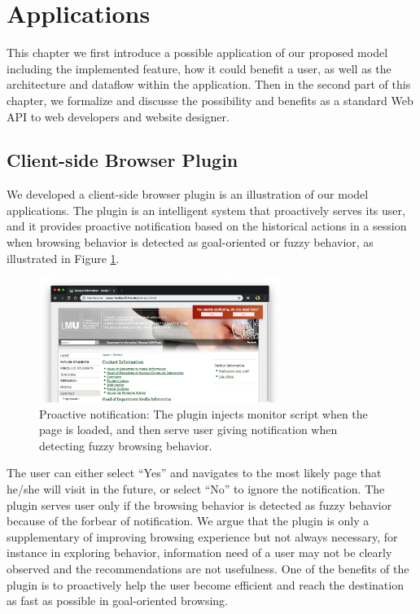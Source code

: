 \section{Applications}
\label{ch:app}

This chapter we first introduce a possible application of our proposed model
including the implemented feature, how it could benefit a user, as well as the 
architecture and dataflow within the application.
Then in the second part of this chapter, we formalize and discusse 
the possibility and benefits as a standard Web API to web developers and website designer.

\subsection{Client-side Browser Plugin}
\label{sec:plugin}

We developed a client-side browser plugin is an illustration of our model applications.
The plugin is an intelligent system that proactively serves its user, 
and it provides proactive notification based on the historical actions in a session
when browsing behavior is detected as goal-oriented or fuzzy behavior, 
as illustrated in Figure \ref{fig:proactive-noti}.

\begin{figure}[H]
    \centering
    \includegraphics[width=0.7\textwidth]{figures/proactive-noti}
    \caption{Proactive notification:
    The plugin injects monitor script when the page is loaded, and then serve user giving
    notification when detecting fuzzy browsing behavior.}
    \label{fig:proactive-noti}
\end{figure}

The user can either select ``Yes'' and navigates to the most likely page that he/she will visit
in the future, or select ``No'' to ignore the notification.
The plugin serves user only if the browsing behavior is detected as fuzzy behavior because
of the forbear of notification. We argue that the plugin is only a supplementary of improving
browsing experience but not always necessary, for instance in exploring behavior, information
need of a user may not be clearly observed and the recommendations are not usefulness. 
One of the benefits of the plugin is to proactively help the user become efficient
and reach the destination as fast as possible in goal-oriented browsing.

